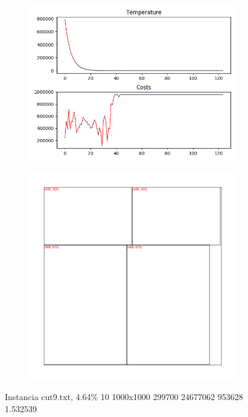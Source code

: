 \begin{figure}
\centering
\begin{subfigure}{.5\textwidth}
  \centering
  \includegraphics[width=1\linewidth]{results/cut9/2/plot}
  \label{fig:sub1}
\end{subfigure}%
\begin{subfigure}{.5\textwidth}
  \centering
  \includegraphics[width=1\linewidth]{results/cut9/2/cut}
  \label{fig:sub2}
\end{subfigure}
\caption{Instancia cut9.txt, 4.64\% 10 1000x1000 299700 24677062 953628 1.532539}
\label{fig:test}
\end{figure}

